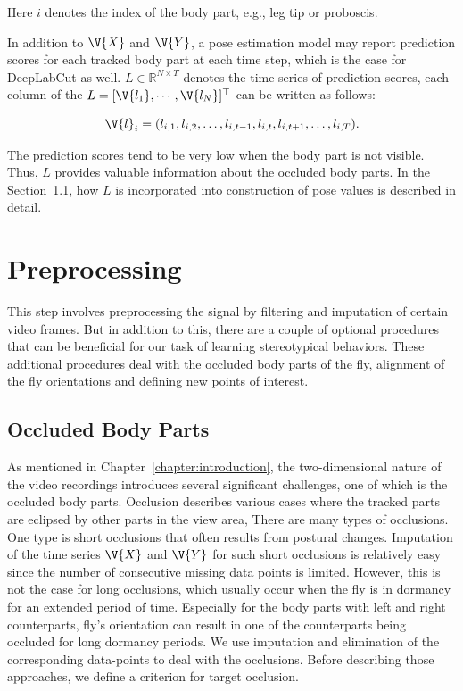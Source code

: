 Here $i$ denotes the index of the body part, e.g., leg tip or proboscis.

In addition to $\V{X}$ and $\V{Y}$, a pose estimation model may report prediction scores for each tracked body part at each time step, which is the case for DeepLabCut as well.
$L \in \mathbb{R}^{N \times T}$ denotes the time series of prediction scores, each column of the $L=[\V{l_1}, \cdots, \V{l_N}]^\top$ can be written as follows:

\begin{equation}
	\V{l}_i = (l_{i,1}, l_{i,2}, \dots, l_{i,t-1}, l_{i,t}, l_{i,t+1}, \dots, l_{i,T}).
\end{equation}

The prediction scores tend to be very low when the body part is not visible.
Thus, $L$ provides valuable information about the occluded body parts.
In the Section~\ref{section:dealing-with-occluded-body-parts}, how $L$ is incorporated into construction of pose values is described in detail.

\section{Preprocessing}
This step involves preprocessing the signal by filtering and imputation of certain video frames.
But in addition to this, there are a couple of optional procedures that can be beneficial for our task of learning stereotypical behaviors.
These additional procedures deal with the occluded body parts of the fly, alignment of the fly orientations and defining new points of interest.

\subsection{Occluded Body Parts}\label{section:dealing-with-occluded-body-parts}
As mentioned in Chapter~\ref{chapter:introduction}, the two-dimensional nature of the video recordings introduces several significant challenges,  one of which is the occluded body parts. Occlusion describes various cases where the tracked parts are eclipsed by other parts in the view area,
There are many types of occlusions. One type is short occlusions that often results from postural changes. Imputation of the time series $\V{X}$ and $\V{Y}$ for such short occlusions is relatively easy since the number of consecutive missing data points is limited.
However, this is not the case for long occlusions, which usually occur when the fly is in dormancy for an extended period of time.
Especially for the body parts with left and right counterparts, fly's orientation can result in one of the counterparts being occluded for long dormancy periods.
We use imputation and elimination of the corresponding data-points to deal with the occlusions. Before describing those approaches, we define a criterion for target occlusion.

